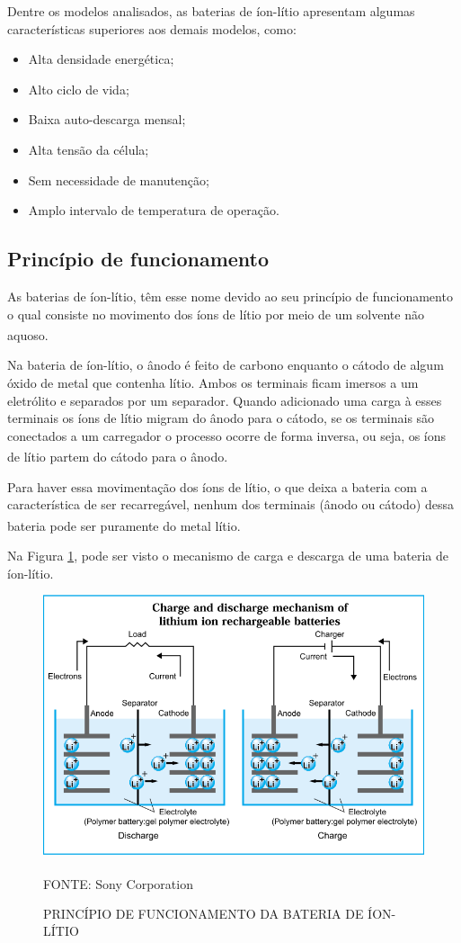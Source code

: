 \documentclass[
	12pt,				%
	openright,			%
	oneside,			%
	a4paper,			%
	english,			%
	french,				%
	spanish,			%
	brazil,				%
	oldfontcommands
	]{abntex2}
\begin{document}
	Dentre os modelos analisados, as baterias de íon-lítio apresentam algumas características superiores aos demais modelos, como:
	\pagebreak
	
	\begin{itemize}
		\item Alta densidade energética;
		\item Alto ciclo de vida;
		\item Baixa auto-descarga mensal;
		\item Alta tensão da célula;
		\item Sem necessidade de manutenção;
		\item Amplo intervalo de temperatura de operação.
	\end{itemize}


\subsection[Princípio de funcionamento]{Princípio de funcionamento}

	
	As baterias de íon-lítio, têm esse nome devido ao seu princípio de funcionamento o qual consiste no movimento dos íons de lítio por meio de um solvente não aquoso.\textsuperscript{\cite{BraEsc}}	
	
	Na bateria de íon-lítio, o ânodo é feito de carbono enquanto o cátodo de algum óxido de metal que contenha lítio. Ambos os terminais ficam imersos a um eletrólito e separados por um separador. Quando adicionado uma carga à esses terminais os íons de lítio migram do ânodo para o cátodo, se os terminais são conectados a um carregador o processo ocorre de forma inversa,  ou seja, os íons de lítio partem do cátodo para o ânodo.\textsuperscript{\cite{sony}}
	
	Para haver essa movimentação dos íons de lítio, o que deixa a bateria com a característica de ser recarregável, nenhum dos terminais (ânodo ou cátodo) dessa bateria pode ser puramente do metal lítio.\textsuperscript{\cite{sony}}
	
	Na Figura \ref{Fig_PF_Bat}, pode ser visto o mecanismo de carga e descarga de uma bateria de íon-lítio.
	
	\begin{figure}[th]
		\caption{PRINCÍPIO DE FUNCIONAMENTO DA BATERIA DE ÍON-LÍTIO}
		\label{Fig_PF_Bat}
		\centering
		\includegraphics[width=0.6\linewidth]{./figs/funcionamento_bateria}
			
		\begin{small}
			FONTE: Sony Corporation\textsuperscript{\cite{sony}}
		\end{small}		
	\end{figure}
	\pagebreak
\end{document}
